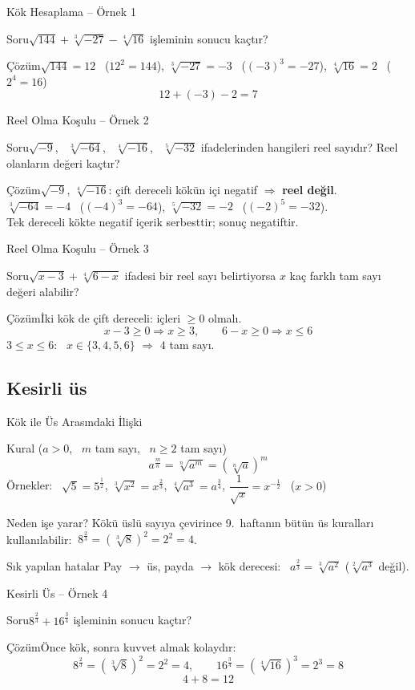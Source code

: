 \documentclass[aspectratio=169,11pt,handout]{beamer}
\newcommand{\soru}[3]{%
\begin{frame}{#1}
  \begin{block}{Soru}\large #2\end{block}
  \pause
  \begin{exampleblock}{Çözüm}\large #3\end{exampleblock}
\end{frame}}
\begin{document}
\soru{Kök Hesaplama -- Örnek 1}
{\(\sqrt{144}+\sqrt[3]{-27}-\sqrt[4]{16}\) işleminin sonucu kaçtır?}
{\(\sqrt{144}=12\) \ (\(12^2=144\)), \quad \(\sqrt[3]{-27}=-3\) \ (\((-3)^3=-27\)), \quad \(\sqrt[4]{16}=2\) \ (\(2^4=16\))
\[12+(-3)-2=7\]}

\soru{Reel Olma Koşulu -- Örnek 2}
{\(\sqrt{-9}\), \ \(\sqrt[3]{-64}\), \ \(\sqrt[4]{-16}\), \ \(\sqrt[5]{-32}\) ifadelerinden hangileri reel sayıdır? Reel olanların değeri kaçtır?}
{\(\sqrt{-9}\), \(\sqrt[4]{-16}\): çift dereceli kökün içi negatif \(\Rightarrow\) \textbf{reel değil}.\\[3pt]
\(\sqrt[3]{-64}=-4\) \ (\((-4)^3=-64\)), \quad \(\sqrt[5]{-32}=-2\) \ (\((-2)^5=-32\)).\\[3pt]
Tek dereceli kökte negatif içerik serbesttir; sonuç negatiftir.}

\soru{Reel Olma Koşulu -- Örnek 3}
{\(\sqrt{x-3}+\sqrt[4]{6-x}\) ifadesi bir reel sayı belirtiyorsa \(x\) kaç farklı tam sayı değeri alabilir?}
{İki kök de çift dereceli: içleri \(\ge 0\) olmalı.
\[x-3\ge 0\Rightarrow x\ge 3,\qquad 6-x\ge 0\Rightarrow x\le 6\]
\(3\le x\le 6\): \ \(x\in\{3,4,5,6\}\) \(\Rightarrow\) \(4\) tam sayı.}

\subsection{Kesirli üs}
\begin{frame}{Kök ile Üs Arasındaki İlişki}
\begin{block}{Kural (\(a>0\), \ \(m\) tam sayı, \ \(n\ge 2\) tam sayı)}
\[a^{\frac{m}{n}}=\sqrt[n]{a^m}=\left(\sqrt[n]{a}\right)^m\]
Örnekler: \ \(\sqrt{5}=5^{\frac12}\), \quad \(\sqrt[3]{x^2}=x^{\frac23}\), \quad \(\sqrt[4]{a^3}=a^{\frac34}\), \quad \(\dfrac{1}{\sqrt{x}}=x^{-\frac12}\) \ (\(x>0\))
\end{block}
\begin{block}{Neden işe yarar?}
Kökü üslü sayıya çevirince 9.~haftanın bütün üs kuralları kullanılabilir:
\(\ 8^{\frac23}=\left(\sqrt[3]{8}\right)^2=2^2=4\).
\end{block}
\begin{alertblock}{Sık yapılan hatalar}
Pay \(\to\) üs, payda \(\to\) kök derecesi: \ \(a^{\frac{2}{3}}=\sqrt[3]{a^2}\) (\(\sqrt[2]{a^3}\) değil).
\end{alertblock}
\end{frame}

\soru{Kesirli Üs -- Örnek 4}
{\(8^{\frac23}+16^{\frac34}\) işleminin sonucu kaçtır?}
{Önce kök, sonra kuvvet almak kolaydır:
\[8^{\frac23}=\left(\sqrt[3]{8}\right)^2=2^2=4,\qquad 16^{\frac34}=\left(\sqrt[4]{16}\right)^3=2^3=8\]
\[4+8=12\]}
\end{document}
